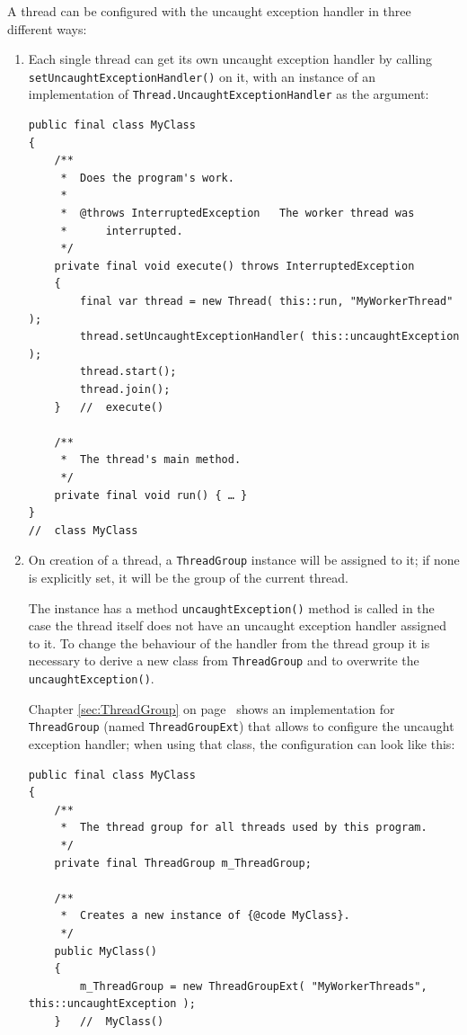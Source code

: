 \documentclass[11pt,a4paper, titlepage, parskip=half, headsepline, footsepline, cleardoublepage=current, headheight=1cm]{scrbook}
\newcommand*{\tqvref}[1]{\hyperref[{#1}]{\ref*{#1}} on page~\pageref{#1}}
\begin{document}
A thread can be configured with the uncaught exception handler in three different ways:
\begin{enumerate}
\item{Each single thread can get its own uncaught exception handler by calling \lstinline|setUncaughtExceptionHandler()|\autocite{ORACLE_DOC_THREAD:setUncaughtExceptionHandler} on it, with an instance of an implementation of \lstinline|Thread.UncaughtExceptionHandler| as the argument:
\begin{lstlisting}
public final class MyClass
{
    /**
     *  Does the program's work.
     *
     *  @throws InterruptedException   The worker thread was
     *      interrupted.
     */
    private final void execute() throws InterruptedException
    {
        final var thread = new Thread( this::run, "MyWorkerThread" );
        thread.setUncaughtExceptionHandler( this::uncaughtException );
        thread.start();
        thread.join();
    }   //  execute()
     
    /**
     *  The thread's main method.
     */
    private final void run() { … }
}
//  class MyClass
\end{lstlisting}
}

\item{On creation of a thread, a \lstinline|ThreadGroup|\autocite{ORACLE_DOC_THREADGROUP_CLASS} instance will be assigned to it; if none is explicitly set, it will be the group of the current thread.

The instance has a method \lstinline|uncaughtException()|\autocite{ORACLE_DOC_THREADGROUP:uncaughtException} method is called in the case the thread itself does not have an uncaught exception handler assigned to it. To change the behaviour of the handler from the thread group it is necessary to derive a new class from \lstinline|ThreadGroup| and to overwrite the \lstinline|uncaughtException()|.

Chapter \tqvref{sec:ThreadGroup} shows an implementation for \lstinline|ThreadGroup| (named \lstinline|ThreadGroupExt|) that allows to configure the uncaught exception handler; when using that class, the configuration can look like this:
\begin{lstlisting}
public final class MyClass
{
    /**
     *  The thread group for all threads used by this program.
     */
    private final ThreadGroup m_ThreadGroup;
    
    /**
     *  Creates a new instance of {@code MyClass}.
     */
    public MyClass()
    {
        m_ThreadGroup = new ThreadGroupExt( "MyWorkerThreads", this::uncaughtException );
    }   //  MyClass()
    

\end{lstlisting}}
\end{enumerate}
\end{document}

